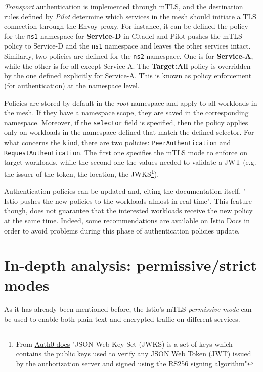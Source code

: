 \textit{Transport} authentication is implemented through mTLS, and the destination rules defined by \textit{Pilot} determine which services in the mesh should initiate a TLS connection through the Envoy proxy.
For instance, it can be defined the policy for the \texttt{ns1} namespace for
\textbf{Service-D} in Citadel and Pilot pushes the mTLS policy to Service-D and 
the \texttt{ns1} namespace and leaves the other services intact. Similarly, two 
policies are defined for the \texttt{ns2} namespace. One is for 
\textbf{Service-A}, while the other is for all except Service-A. The 
\textbf{Target:All} policy is overridden by the one defined explicitly for 
Service-A.
This is known as policy enforcement (for authentication) at the namespace level.

Policies are stored by default in the \textit{root} namespace and apply to all workloads in the mesh. If they have a namespace scope, they are saved in the corresponding namespace. Moreover, if the \texttt{selector} field is specified, then the policy applies only on workloads in the namespace defined that match the defined selector. For what concerns the \texttt{kind}, there are two policies: \texttt{PeerAuthentication} and \texttt{RequestAuthentication}. The first one specifies the mTLS mode to enforce on target workloads, while the second one the values needed to validate a JWT (e.g. the issuer of the token, the location, the JWKS\footnote{From \href{https://auth0.com/docs/tokens/concepts/jwks}{Auth0 docs} "JSON Web Key Set (JWKS) is a set of keys which contains the public keys used to verify any JSON Web Token (JWT) issued by the authorization server and signed using the RS256 signing algorithm"}).

Authentication policies can be updated and, citing the documentation itself, " Istio pushes the new policies to the workloads almost in real time". This feature though, does not guarantee that the interested workloads receive the new policy at the same time. Indeed, some recommendations are available on Istio Docs in order to avoid problems during this phase of authentication policies update.

\section{In-depth analysis: permissive/strict modes}
As it has already been mentioned before, the Istio's mTLS \textit{permissive mode} can be used to enable both plain text and encrypted traffic on different services.

